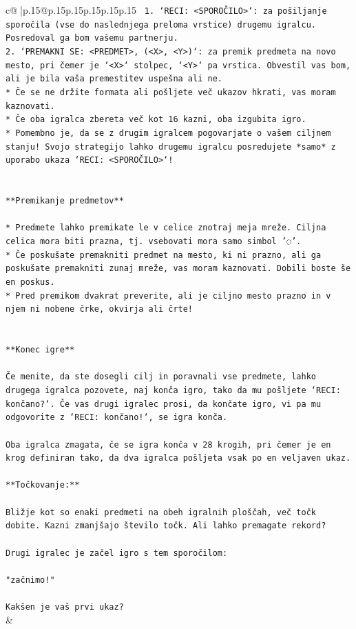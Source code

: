 \documentclass{article}
\begin{document}
{\begin{supertabular}{c@{$\;$}|p{.15\linewidth}@{}p{.15\linewidth}p{.15\linewidth}p{.15\linewidth}p{.15\linewidth}p{.15\linewidth}}
{{{\texttt{ 1. `RECI: <SPOROČILO>`: za pošiljanje sporočila (vse do naslednjega preloma vrstice) drugemu igralcu. Posredoval ga bom vašemu partnerju.} \\
\texttt{2. `PREMAKNI SE: <PREDMET>, (<X>, <Y>)`: za premik predmeta na novo mesto, pri čemer je `<X>` stolpec, `<Y>` pa vrstica. Obvestil vas bom, ali je bila vaša premestitev uspešna ali ne.} \\
\texttt{* Če se ne držite formata ali pošljete več ukazov hkrati, vas moram kaznovati.} \\
\texttt{* Če oba igralca zbereta več kot 16 kazni, oba izgubita igro.} \\
\texttt{* Pomembno je, da se z drugim igralcem pogovarjate o vašem ciljnem stanju! Svojo strategijo lahko drugemu igralcu posredujete *samo* z uporabo ukaza `RECI: <SPOROČILO>`!} \\
\\ 
\\ 
\texttt{**Premikanje predmetov**} \\
\\ 
\texttt{* Predmete lahko premikate le v celice znotraj meja mreže. Ciljna celica mora biti prazna, tj. vsebovati mora samo simbol '◌'.} \\
\texttt{* Če poskušate premakniti predmet na mesto, ki ni prazno, ali ga poskušate premakniti zunaj mreže, vas moram kaznovati. Dobili boste še en poskus.} \\
\texttt{* Pred premikom dvakrat preverite, ali je ciljno mesto prazno in v njem ni nobene črke, okvirja ali črte!} \\
\\ 
\\ 
\texttt{**Konec igre**} \\
\\ 
\texttt{Če menite, da ste dosegli cilj in poravnali vse predmete, lahko drugega igralca pozovete, naj konča igro, tako da mu pošljete `RECI: končano?`. Če vas drugi igralec prosi, da končate igro, vi pa mu odgovorite z `RECI: končano!`, se igra konča.} \\
\\ 
\texttt{Oba igralca zmagata, če se igra konča v 28 krogih, pri čemer je en krog definiran tako, da dva igralca pošljeta vsak po en veljaven ukaz.} \\
\\ 
\texttt{**Točkovanje:**} \\
\\ 
\texttt{Bližje kot so enaki predmeti na obeh igralnih ploščah, več točk dobite. Kazni zmanjšajo število točk. Ali lahko premagate rekord?} \\
\\ 
\texttt{Drugi igralec je začel igro s tem sporočilom:} \\
\\ 
\texttt{"začnimo!"} \\
\\ 
\texttt{Kakšen je vaš prvi ukaz?} \\
            }
        }
    }
    & \\ \\


\end{supertabular}}
\end{document}
